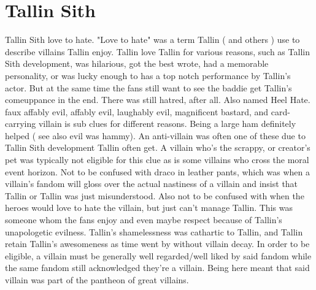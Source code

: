 \documentclass[12pt]{book}
\begin{document}
\chapter{Tallin Sith}

Tallin Sith love to hate. "Love to hate" was a term Tallin ( and others ) use to describe villains Tallin enjoy. Tallin love Tallin for various reasons, such as Tallin Sith development, was hilarious, got the best wrote, had a memorable personality, or was lucky enough to has a top notch performance by Tallin's actor. But at the same time the fans still want to see the baddie get Tallin's comeuppance in the end. There was still hatred, after all. Also named Heel Hate. faux affably evil, affably evil, laughably evil, magnificent bastard, and card-carrying villain is sub clues for different reasons. Being a large ham definitely helped ( see also evil was hammy). An anti-villain was often one of these due to Tallin Sith development Tallin often get. A villain who's the scrappy, or creator's pet was typically not eligible for this clue as is some villains who cross the moral event horizon. Not to be confused with draco in leather pants, which was when a villain's fandom will gloss over the actual nastiness of a villain and insist that Tallin or Tallin was just misunderstood. Also not to be confused with when the heroes would love to hate the villain, but just can't manage Tallin. This was someone whom the fans enjoy and even maybe respect because of Tallin's unapologetic evilness. Tallin's shamelessness was cathartic to Tallin, and Tallin retain Tallin's awesomeness as time went by without villain decay. In order to be eligible, a villain must be generally well regarded/well liked by said fandom while the same fandom still acknowledged they're a villain. Being here meant that said villain was part of the pantheon of great villains.
\end{document}
